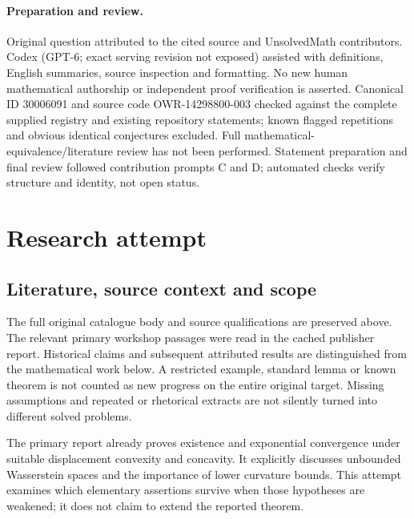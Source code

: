 \documentclass[11pt]{article}
\begin{document}
\paragraph{Preparation and review.}
Original question attributed to the cited source and UnsolvedMath contributors. Codex (GPT-6; exact serving revision not exposed) assisted with definitions, English summaries, source inspection and formatting. No new human mathematical authorship or independent proof verification is asserted. Canonical ID 30006091 and source code OWR-14298800-003 checked against the complete supplied registry and existing repository statements; known flagged repetitions and obvious identical conjectures excluded. Full mathematical-equivalence/literature review has not been performed. Statement preparation and final review followed contribution prompts C and D; automated checks verify structure and identity, not open status.
\label{end:30006091}

\section{Research attempt}
\subsection{Literature, source context and scope}
The full original catalogue body and source qualifications are preserved above. The relevant primary workshop passages were read in the cached publisher report. Historical claims and subsequent attributed results are distinguished from the mathematical work below. A restricted example, standard lemma or known theorem is not counted as new progress on the entire original target. Missing assumptions and repeated or rhetorical extracts are not silently turned into different solved problems.

The primary report already proves existence and exponential convergence under suitable displacement convexity and concavity. It explicitly discusses unbounded Wasserstein spaces and the importance of lower curvature bounds. This attempt examines which elementary assertions survive when those hypotheses are weakened; it does not claim to extend the reported theorem.
\end{document}
